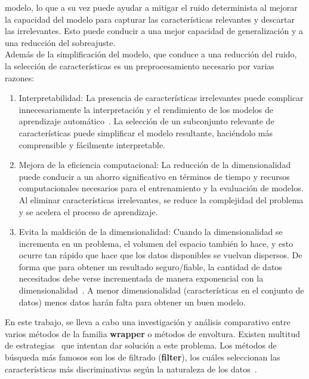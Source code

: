 modelo, lo que a su vez puede ayudar a mitigar el ruido determinista al mejorar la capacidad
del modelo para capturar las características relevantes y descartar las irrelevantes.
Esto puede conducir a una mejor capacidad de generalización y a una reducción del sobreajuste.\\[6pt]
Además de la simplificación del modelo, que conduce a una reducción del ruido, la
selección de características es un preprocesamiento necesario por varias razones:
\begin{enumerate}
      \item Interpretabilidad: La presencia de características
            irrelevantes puede complicar innecesariamente la interpretación y el
            rendimiento de los modelos de aprendizaje automático~\cite{miao_survey_2016}. La selección de un
            subconjunto relevante de características puede simplificar el modelo
            resultante, haciéndolo más comprensible y fácilmente interpretable.

      \item Mejora de la eficiencia computacional: La reducción de la
            dimensionalidad puede conducir a un ahorro significativo en términos de
            tiempo y recursos computacionales necesarios para el entrenamiento y la
            evaluación de modelos. Al eliminar características irrelevantes, se reduce
            la complejidad del problema y se acelera el proceso de aprendizaje.

      \item Evita la maldición de la dimensionalidad: Cuando la dimensionalidad
            se incrementa en un problema, el volumen del espacio también lo hace, y esto ocurre
            tan rápido que  hace que los datos disponibles se vuelvan dispersos. De forma que para
            obtener un resultado seguro/fiable, la cantidad de datos necesitados debe verse
            incrementada de manera exponencial con la dimensionalidad~\cite{udacity2015curse}. A menor dimensionalidad
            (características en el conjunto de datos) menos datos harán falta para obtener un buen
            modelo.
\end{enumerate}
En este trabajo, se lleva a cabo una investigación y análisis comparativo entre varios métodos
de la familia \textbf{wrapper} o métodos de envoltura. Existen multitud de estrategias~\cite{miao_survey_2016}
que intentan dar solución a este problema. Los métodos de búsqueda más famosos son los de filtrado
(\textbf{filter}), los cuáles seleccionan las características más discriminativas según la naturaleza de los datos~\cite{miao_survey_2016}.
